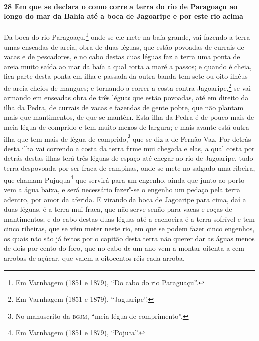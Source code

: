 \begin{linenumbers}
\paragraph{28 Em que se declara o como corre a terra do rio de Paragoaçu ao longo do mar
da Bahia até a boca de Jagoaripe e por este rio acima}\quad
Da boca do rio Paragoaçu,\footnote{ Em Varnhagem (1851 e 1879), ``Do cabo do rio
Paraguaçu''.} onde se ele mete na baía grande, vai fazendo a terra umas enseadas de areia,
obra de duas léguas, que estão povoadas de currais de vacas e de pescadores, e no cabo
destas duas léguas faz a terra uma ponta de areia muito saída ao mar da baía a qual corta
a maré a passos; e quando é cheia, fica parte desta ponta em ilha e passada da outra banda
tem sete ou oito ilhéus de areia cheios de mangues; e tornando a correr a costa contra
Jagoaripe,\footnote{ Em Varnhagem (1851 e 1879), ``Jaguaripe''.} se vai armando em
enseadas obra de três léguas que estão povoadas, até em direito da ilha da Pedra, de
currais de vacas e fazendas de gente pobre, que não plantam mais que mantimentos, de que
se mantêm. Esta ilha da Pedra é de pouco mais de meia légua de comprido e tem muito menos
de largura; e mais avante está outra ilha que tem mais de légua de comprido,\footnote{ No
manuscrito da \textsc{bgjm}, ``meia légua de comprimento''.} que se diz a de Fernão Vaz.
Por detrás desta ilha vai correndo a costa da terra firme mui chegada e elas, a qual costa
por detrás destas ilhas terá três léguas de espaço até chegar ao rio de Jagoaripe, tudo
terra despovoada por ser fraca de campinas, onde se mete no salgado uma ribeira, que
chamam Pujuqua\footnote{ Em Varnhagem (1851 e 1879), ``Pojuca''.} que servirá para um
engenho, ainda que junto ao porto vem a água baixa, e será necessário fazer"-se o engenho
um pedaço pela terra adentro, por amor da aferida. E virando da boca de Jagoaripe para
cima, daí a duas léguas, é a terra mui fraca, que não serve senão para vacas e roças de
mantimentos; e do cabo destas duas léguas até a cachoeira é a terra sofrível e tem cinco
ribeiras, que se vêm meter neste rio, em que se podem fazer cinco engenhos, os quais não
são já feitos por o capitão desta terra não querer dar as águas menos de dois por cento do
foro, que no cabo de um ano vem a montar oitenta a cem arrobas de açúcar, que valem a
oitocentos réis cada arroba.


\end{linenumbers}
